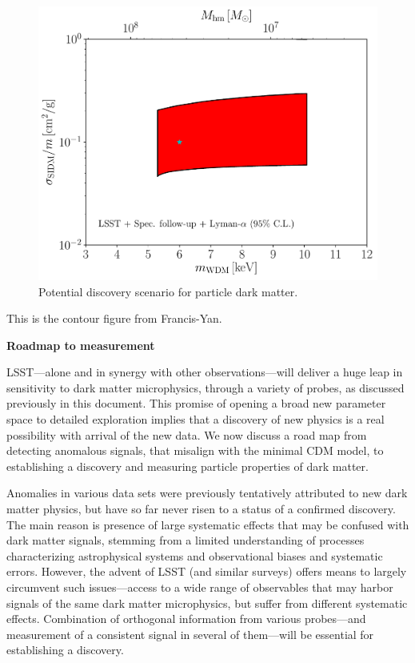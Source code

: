 \begin{figure}
\centering
\includegraphics[width=0.6\columnwidth]{figures/SIDM_WDM_fig_disc.pdf}
\caption{\label{fig:sidm_wdm_disc} Potential discovery scenario for particle dark matter. }
\end{figure}



This is the contour figure from Francis-Yan.

{\bf Roadmap to measurement}

LSST---alone and in synergy with other observations---will deliver a huge leap in sensitivity to dark matter microphysics, through a variety of probes, as discussed previously in this document. 
This promise of opening a broad new parameter space to detailed exploration implies that a discovery of new physics is a real possibility with arrival of the new data. 
We now discuss a road map from detecting anomalous signals, that misalign with the minimal CDM model, to establishing a discovery and measuring particle properties of dark matter.

Anomalies in various data sets were previously tentatively attributed to new dark matter physics, but have so far never risen to a status of a confirmed discovery. 
The main reason is presence of large systematic effects that may be confused with dark matter signals, stemming from a limited understanding of processes characterizing astrophysical systems and observational biases and systematic errors. 
However, the advent of LSST (and similar surveys) offers means to largely circumvent such issues---access to a wide range of observables that may harbor signals of the same dark matter microphysics, but suffer from different systematic effects. 
Combination of orthogonal information from various probes---and measurement of a consistent signal in several of them---will be essential for establishing a discovery. 

